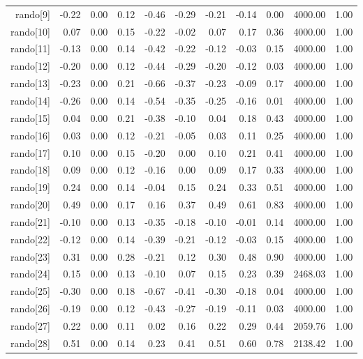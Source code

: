 \begin{table}[ht]
\begin{tabular}{rrrrrrrrrrr}
  rando[9] & -0.22 & 0.00 & 0.12 & -0.46 & -0.29 & -0.21 & -0.14 & 0.00 & 4000.00 & 1.00 \\ 
  rando[10] & 0.07 & 0.00 & 0.15 & -0.22 & -0.02 & 0.07 & 0.17 & 0.36 & 4000.00 & 1.00 \\ 
  rando[11] & -0.13 & 0.00 & 0.14 & -0.42 & -0.22 & -0.12 & -0.03 & 0.15 & 4000.00 & 1.00 \\ 
  rando[12] & -0.20 & 0.00 & 0.12 & -0.44 & -0.29 & -0.20 & -0.12 & 0.03 & 4000.00 & 1.00 \\ 
  rando[13] & -0.23 & 0.00 & 0.21 & -0.66 & -0.37 & -0.23 & -0.09 & 0.17 & 4000.00 & 1.00 \\ 
  rando[14] & -0.26 & 0.00 & 0.14 & -0.54 & -0.35 & -0.25 & -0.16 & 0.01 & 4000.00 & 1.00 \\ 
  rando[15] & 0.04 & 0.00 & 0.21 & -0.38 & -0.10 & 0.04 & 0.18 & 0.43 & 4000.00 & 1.00 \\ 
  rando[16] & 0.03 & 0.00 & 0.12 & -0.21 & -0.05 & 0.03 & 0.11 & 0.25 & 4000.00 & 1.00 \\ 
  rando[17] & 0.10 & 0.00 & 0.15 & -0.20 & 0.00 & 0.10 & 0.21 & 0.41 & 4000.00 & 1.00 \\ 
  rando[18] & 0.09 & 0.00 & 0.12 & -0.16 & 0.00 & 0.09 & 0.17 & 0.33 & 4000.00 & 1.00 \\ 
  rando[19] & 0.24 & 0.00 & 0.14 & -0.04 & 0.15 & 0.24 & 0.33 & 0.51 & 4000.00 & 1.00 \\ 
  rando[20] & 0.49 & 0.00 & 0.17 & 0.16 & 0.37 & 0.49 & 0.61 & 0.83 & 4000.00 & 1.00 \\ 
  rando[21] & -0.10 & 0.00 & 0.13 & -0.35 & -0.18 & -0.10 & -0.01 & 0.14 & 4000.00 & 1.00 \\ 
  rando[22] & -0.12 & 0.00 & 0.14 & -0.39 & -0.21 & -0.12 & -0.03 & 0.15 & 4000.00 & 1.00 \\ 
  rando[23] & 0.31 & 0.00 & 0.28 & -0.21 & 0.12 & 0.30 & 0.48 & 0.90 & 4000.00 & 1.00 \\ 
  rando[24] & 0.15 & 0.00 & 0.13 & -0.10 & 0.07 & 0.15 & 0.23 & 0.39 & 2468.03 & 1.00 \\ 
  rando[25] & -0.30 & 0.00 & 0.18 & -0.67 & -0.41 & -0.30 & -0.18 & 0.04 & 4000.00 & 1.00 \\ 
  rando[26] & -0.19 & 0.00 & 0.12 & -0.43 & -0.27 & -0.19 & -0.11 & 0.03 & 4000.00 & 1.00 \\ 
  rando[27] & 0.22 & 0.00 & 0.11 & 0.02 & 0.16 & 0.22 & 0.29 & 0.44 & 2059.76 & 1.00 \\ 
  rando[28] & 0.51 & 0.00 & 0.14 & 0.23 & 0.41 & 0.51 & 0.60 & 0.78 & 2138.42 & 1.00 \\ 

\end{tabular}
\end{table}
